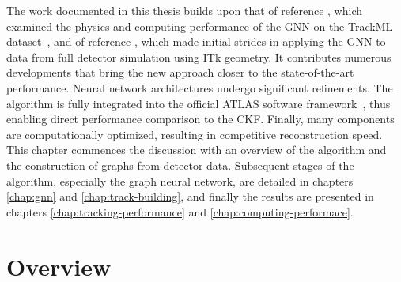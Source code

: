 The work documented in this thesis builds upon that of reference \cite{exatrkx}, which examined the physics and computing performance 
of the GNN on the TrackML dataset~\cite{trackml-particle-identification}, and of reference \cite{Caillou:ATL-ITK-PROC-2022-006}, 
which made initial strides in applying the GNN to data from full detector simulation using ITk geometry. 
It contributes numerous developments that bring the new approach closer to the state-of-the-art performance.
Neural network architectures undergo significant refinements.
The algorithm is fully integrated into the official ATLAS software framework~\cite{atlas_collaboration_2021_4772550}, thus enabling direct performance comparison to the CKF.
Finally, many components are computationally optimized, resulting in competitive reconstruction speed.
This chapter commences the discussion with an overview of the algorithm and the construction of graphs from detector data. 
Subsequent stages of the algorithm, especially the graph neural network, are detailed in chapters \ref{chap:gnn} and \ref{chap:track-building}, and finally the results are presented in chapters \ref{chap:tracking-performance} and \ref{chap:computing-performace}.


\section{Overview}

